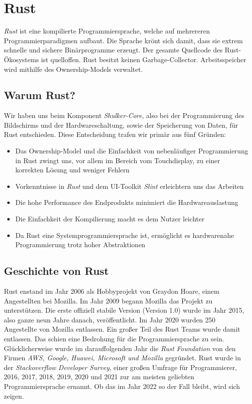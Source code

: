 \section{Rust}
\label{Rust}
\lstset{language=rust}

\textit{Rust} ist eine kompilierte Programmiersprache, welche auf mehrereren
Programmierparadigmen aufbaut. Die Sprache krönt sich damit, dass
sie extrem schnelle und sichere Binärprogramme erzeugt. \cite{rustlangbook1}
Der gesamte Quellcode des Rust-Ökosystems ist quelloffen. Rust besitzt keinen Garbage-Collector.
Arbeitsspeicher wird mithilfe des Ownership-Models verwaltet.

\subsection{Warum Rust?}
Wir haben uns beim Komponent \textit{Shulker-Core}, also bei der Programmierung
des Bildschirms und der Hardwareschaltung, sowie der Speicherung
von Daten, für Rust entschieden. Diese Entscheidung trafen wir primär
aus fünf Gründen:

\begin{itemize}
    \item Das Ownership-Model und die Einfachkeit von nebenläufiger Programmierung in Rust zwingt uns, vor allem im Bereich vom Touchdisplay, zu einer korrekten Lösung und weniger Fehlern
    \item Vorkenntnisse in \textit{Rust} und dem UI-Toolkit \textit{Slint} erleichtern uns das Arbeiten
    \item Die hohe Performance des Endprodukts minimiert die Hardwareauslastung
    \item Die Einfachkeit der Kompilierung macht es dem Nutzer leichter
    \item Da Rust eine Systemprogrammiersprache ist, ermöglicht es hardwarenahe Programmierung trotz hoher Abstraktionen
\end{itemize}

\subsection{Geschichte von Rust}
Rust enstand im Jahr 2006 als Hobbyprojekt von Graydon Hoare, einem Angestellten
bei Mozilla. Im Jahr 2009 begann Mozilla das Projekt zu unterstützen. Die erste
offiziell stabile Version (Version 1.0) wurde im Jahr 2015, also ganze neun Jahre danach, veröffentlicht.
Im Jahr 2020 wurden 250 Angestellte von Mozilla entlassen.  Ein großer
Teil des Rust Teams wurde damit entlassen. Das schien eine Bedrohung für
die Programmiersprache zu sein. Glücklicherweise wurde im darauffolgenden Jahr die
\textit{Rust Foundation} von den Firmen \textit{AWS, Google, Huawei, Microsoft und Mozilla} gegründet.
Rust wurde in der \textit{Stackoverflow Developer Survey}, einer großen Umfrage
für Programmierer, 2016, 2017, 2018, 2019, 2020 und 2021 zur am meisten geliebten Programmiersprache
ernannt. Ob das im Jahr 2022 so der Fall bleibt, wird sich zeigen.



